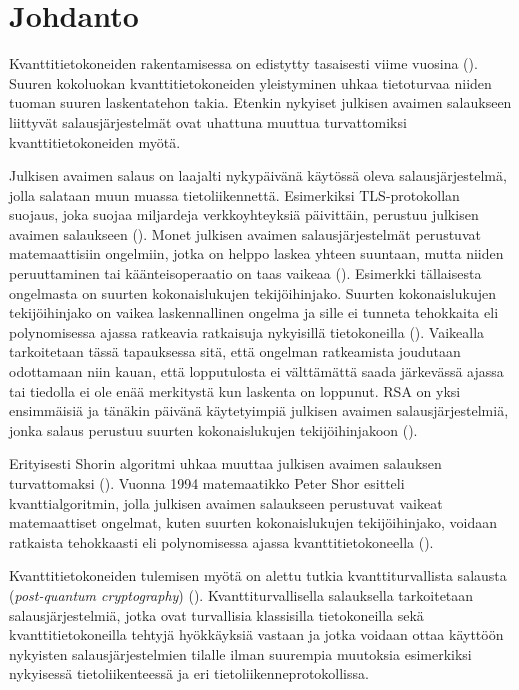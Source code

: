 \chapter{Johdanto\label{intro}}
Kvanttitietokoneiden rakentamisessa on edistytty tasaisesti viime vuosina (\cite{alagic2020status}). Suuren kokoluokan kvanttitietokoneiden yleistyminen uhkaa tietoturvaa niiden tuoman suuren laskentatehon takia. Etenkin nykyiset julkisen avaimen salaukseen liittyvät salausjärjestelmät ovat uhattuna muuttua turvattomiksi kvanttitietokoneiden myötä.

Julkisen avaimen salaus on laajalti nykypäivänä käytössä oleva salausjärjestelmä, jolla salataan muun muassa tietoliikennettä. Esimerkiksi TLS-protokollan suojaus, joka suojaa miljardeja verkkoyhteyksiä päivittäin, perustuu julkisen avaimen salaukseen (\cite{buchmann2016post}). %
Monet julkisen avaimen salausjärjestelmät perustuvat matemaattisiin ongelmiin, jotka on helppo laskea yhteen suuntaan, mutta niiden peruuttaminen tai käänteisoperaatio on taas vaikeaa (\cite{mavroeidis2018impact}). Esimerkki tällaisesta ongelmasta on suurten kokonaislukujen tekijöihinjako. Suurten kokonaislukujen tekijöihinjako on vaikea laskennallinen ongelma ja sille ei tunneta tehokkaita eli polynomisessa ajassa ratkeavia ratkaisuja nykyisillä tietokoneilla (\cite{doi:10.1137/S0036144598347011}). Vaikealla tarkoitetaan tässä tapauksessa sitä, että ongelman ratkeamista joudutaan odottamaan niin kauan, että lopputulosta ei välttämättä saada järkevässä ajassa tai tiedolla ei ole enää merkitystä kun laskenta on loppunut. %
RSA on yksi ensimmäisiä ja tänäkin päivänä käytetyimpiä julkisen avaimen salausjärjestelmiä, jonka salaus perustuu suurten kokonaislukujen tekijöihinjakoon (\cite{montgomery1994survey}).

Erityisesti Shorin algoritmi uhkaa muuttaa julkisen avaimen salauksen turvattomaksi (\cite{mavroeidis2018impact}). Vuonna 1994 matemaatikko Peter Shor esitteli kvanttialgoritmin, jolla julkisen avaimen salaukseen perustuvat vaikeat matemaattiset ongelmat, kuten suurten kokonaislukujen tekijöihinjako, voidaan ratkaista tehokkaasti eli polynomisessa ajassa kvanttitietokoneella (\cite{doi:10.1137/S0036144598347011}).

Kvanttitietokoneiden tulemisen myötä on alettu tutkia kvanttiturvallista salausta (\emph{post-quantum cryptography}) (\cite{alagic2020status}). Kvanttiturvallisella salauksella tarkoitetaan salausjärjestelmiä, jotka ovat turvallisia klassisilla tietokoneilla sekä kvanttitietokoneilla tehtyjä hyökkäyksiä vastaan ja jotka voidaan ottaa käyttöön nykyisten salausjärjestelmien tilalle ilman suurempia muutoksia esimerkiksi nykyisessä tietoliikenteessä ja eri tietoliikenneprotokollissa.

